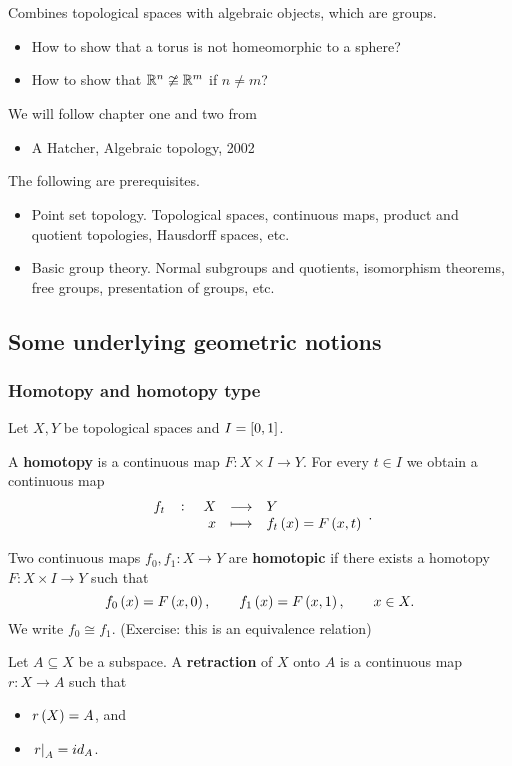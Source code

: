Combines topological spaces with algebraic objects, which are groups.
\begin{itemize}
\item How to show that a torus is not homeomorphic to a sphere?
\item How to show that $ \mathbb{R}^n \ncong \mathbb{R}^m $ if $ n \ne m $?
\end{itemize}
We will follow chapter one and two from
\begin{itemize}
\item A Hatcher, Algebraic topology, 2002
\end{itemize}
The following are prerequisites.
\begin{itemize}
\item Point set topology. Topological spaces, continuous maps, product and quotient topologies, Hausdorff spaces, etc.
\item Basic group theory. Normal subgroups and quotients, isomorphism theorems, free groups, presentation of groups, etc.
\end{itemize}

\pagebreak

\subsection{Some underlying geometric notions}

\subsubsection{Homotopy and homotopy type}

Let $ X, Y $ be topological spaces and $ I = \sbr{0, 1} $.

\begin{definition*}
A \textbf{homotopy} is a continuous map $ F : X \times I \to Y $. For every $ t \in I $ we obtain a continuous map
$$ \function[f_t]{X}{Y}{x}{f_t\br{x} = F\br{x, t}}. $$
\end{definition*}

\begin{definition*}
Two continuous maps $ f_0, f_1 : X \to Y $ are \textbf{homotopic} if there exists a homotopy $ F : X \times I \to Y $ such that
$$ f_0\br{x} = F\br{x, 0}, \qquad f_1\br{x} = F\br{x, 1}, \qquad x \in X. $$
We write $ f_0 \cong f_1 $. (Exercise: this is an equivalence relation)
\end{definition*}

\begin{definition*}
Let $ A \subseteq X $ be a subspace. A \textbf{retraction} of $ X $ onto $ A $ is a continuous map $ r : X \to A $ such that
\begin{itemize}
\item $ r\br{X} = A $, and
\item $ \left. r \right|_A = id_A $.
\end{itemize}
\end{definition*}

